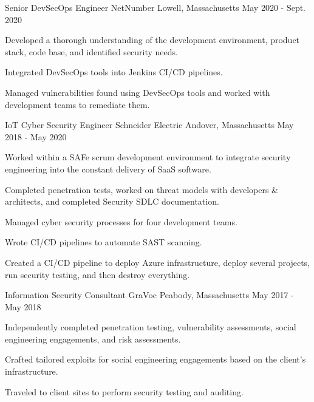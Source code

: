 \begin{cventries}
  \cventry
    {Senior DevSecOps Engineer} %
    {NetNumber} %
    {Lowell, Massachusetts} %
    {May 2020 - Sept. 2020} %
    {
      \begin{cvitems} %
        \item {
            Developed a thorough understanding of the development environment, product stack, code base, and identified security needs.
        }
        \item {
            Integrated DevSecOps tools into Jenkins CI/CD pipelines.
        }
        \item {
            Managed vulnerabilities found using DevSecOps tools and worked with development teams to remediate them.
        }
      \end{cvitems}
    }

  \cventry
    {IoT Cyber Security Engineer} %
    {Schneider Electric} %
    {Andover, Massachusetts} %
    {May 2018 - May 2020} %
    {
      \begin{cvitems} %
        \item {
            Worked within a SAFe scrum development environment to integrate security engineering into the constant delivery of SaaS software.
        }
        \item {
            Completed penetration tests, worked on threat models with developers \& architects, and completed Security SDLC documentation.
        }
        \item {
            Managed cyber security processes for four development teams.
        }
        \item {
            Wrote CI/CD pipelines to automate SAST scanning.
        }
        \item {
            Created a CI/CD pipeline to deploy Azure infrastructure, deploy several projects, run security testing, and then destroy everything.
        }
      \end{cvitems}
    }

  \cventry
    {Information Security Consultant} %
    {GraVoc} %
    {Peabody, Massachusetts} %
    {May 2017 - May 2018} %
    {
      \begin{cvitems} %
        \item {
            Independently completed penetration testing, vulnerability assessments, social engineering engagements, and risk assessments.
        }
        \item {
            Crafted tailored exploits for social engineering engagements based on the client's infrastructure.
        }
        \item {
            Traveled to client sites to perform security testing and auditing.
        }
      \end{cvitems}
    }


\end{cventries}
